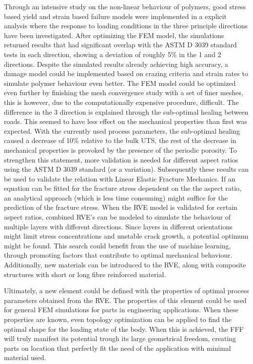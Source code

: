 Through an intensive study on the non-linear behaviour of polymers, good stress based yield and strain based failure models were implemented in a explicit analysis where the response to loading conditions in the three principle directions have been investigated. After optimizing the FEM model, the simulations returned results that had significant overlap with the ASTM D 3039 standard tests in each direction, showing a deviation of roughly 5\% in the 1 and 2 directions. Despite the simulated results already achieving high accuracy, a damage model could be implemented based on crazing criteria and strain rates to simulate polymer behaviour even better. The FEM model could be optimized even further by finishing the mesh convergence study with a set of finer meshes, this is however, due to the computationally expensive procedure, difficult. The difference in the 3 direction is explained through the sub-optimal healing between roads. This seemed to have less effect on the mechanical properties than first was expected. With the currently used process parameters, the sub-optimal healing caused a decrease of 10\% relative to the bulk UTS, the rest of the decrease in mechanical properties is provoked by the presence of the periodic porosity. To strengthen this statement, more validation is needed for different aspect ratios using the ASTM D 3039 standard (or a variation).  Subsequently these results can be used to validate the relation with Linear Elastic Fracture Mechanics. If an equation can be fitted for the fracture stress dependent on the the aspect ratio, an analytical approach (which is less time consuming) might suffice for the prediction of the fracture stress. 
When the RVE model is validated for certain aspect ratios, combined RVE's can be modeled to simulate the behaviour of multiple layers with different directions. Since layers in different orientations might limit stress concentrations and unstable crack growth, a potential optimum might be found. This search could benefit from the use of machine learning, through promoting factors that contribute to optimal mechanical behaviour. Additionally, new materials can be introduced to the RVE, along with composite structures with short or long fibre reinforced material.  

Ultimately, a new element could be defined with the properties of optimal process parameters obtained from the RVE. The properties of this element could be used for general FEM simulations for parts in engineering applications. When these properties are known, even topology optimization can be applied to find the optimal shape for the loading state of the body. 
When this is achieved, the FFF will truly manifest its potential trough its large geometrical freedom, creating parts on location that perfectly fit the need of the application with minimal material used. 

